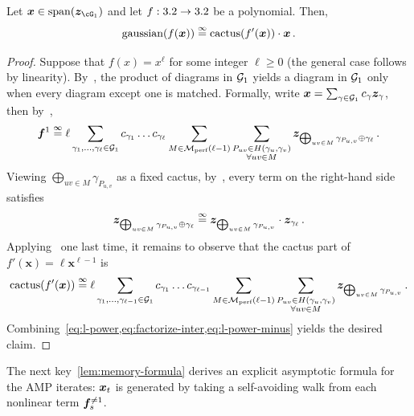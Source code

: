 \begin{lemma}\label{lem:f-linear}
    Let $\bmx \in \linspan(\bmz_{\cG_1})$ and let $f : 3.2 \to 3.2$ be a polynomial.
    Then,
    \[
        \textnormal{gaussian}(f(\bm x)) \overset{\infty}{=} \operatorname{cactus}(f'(\bm x)) \cdot \bm x\,.
    \]
\end{lemma}
\begin{proof}
    Suppose that $f(x) = x^\ell$ for some integer $\ell\ge 0$ (the general case follows by linearity). By~,
    the product of
    diagrams in ${\cal G}_1$
    yields a diagram in ${\cal G}_1$ only
    when every diagram except one is matched. Formally, write ${\bm x} = \sum_{\gamma\in{\cal G}_1} c_\gamma {\bm z}_{\gamma}$, then by~,
    \begin{align}
        {\bm f}^1 \overset{\infty}{=} \ell \sum_{\gamma_1,\ldots,\gamma_\ell\in {\cal G}_1} c_{\gamma_1}\ldots c_{\gamma_{\ell}} \sum_{M\in \mathcal{M}_{\textnormal{perf}}(\ell-1)} \sum_{\substack{P_{uv}\in H(\gamma_u,\gamma_v)\\\forall uv\in M}} {\bm z}_{\bigoplus_{uv\in M}\gamma_{P_{u,v}} \oplus \gamma_\ell} \,.\label{eq:l-power}
    \end{align}
    Viewing $\bigoplus_{uv\in M}\gamma_{P_{u,v}}$ as a fixed cactus, by~,
    every term on the right-hand side
    satisfies
    \begin{align}
        {\bm z}_{\bigoplus_{uv\in M}\gamma_{P_{u,v}} \oplus \gamma_\ell} \overset{\infty}{=} {\bm z}_{\bigoplus_{uv\in M}\gamma_{P_{u,v}}} \cdot {\bm z}_{\gamma_\ell}\,.\label{eq:factorize-inter}
    \end{align}
    Applying~
    one last time, it remains to observe 
    that the cactus part of $f'(\bm x) = \ell \bm x^{\ell-1}$ is
    \begin{align}
        \operatorname{cactus}(f'({\bm x})) \overset{\infty}{=} \ell \sum_{\gamma_1,\ldots,\gamma_{\ell-1}\in {\cal G}_1} c_{\gamma_1} \ldots c_{\gamma_{\ell-1}} \sum_{M\in \mathcal{M}_{\textnormal{perf}}(\ell-1)} \sum_{\substack{P_{uv}\in H(\gamma_u,\gamma_v)\\\forall uv\in M}} {\bm z}_{\bigoplus_{uv\in M}\gamma_{P_{u,v}}}\,.\label{eq:l-power-minus}
    \end{align}
    Combining~\cref{eq:l-power,eq:factorize-inter,eq:l-power-minus} yields the desired claim.
\end{proof}

The next key~\cref{lem:memory-formula} derives an explicit asymptotic formula for the AMP iterates: ${\bm x}_t$ is generated by taking a self-avoiding walk from each nonlinear term ${\bm f}_s^{\neq 1}$.

